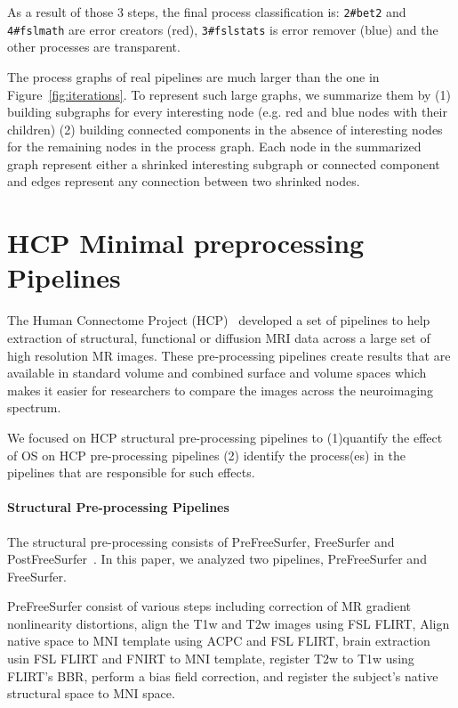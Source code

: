 \documentclass{article}
\begin{document}
{ As a result of those 3 steps, the final process classification is: 
 \texttt{2\#bet2} and \texttt{4\#fslmath} are error creators (red), 
 \texttt{3\#fslstats} is error remover (blue) and the other processes 
 are transparent.

The process graphs of real pipelines are much larger than the one in 
Figure~\ref{fig:iterations}. To represent such large graphs, we 
summarize them by (1) building subgraphs for every interesting node 
(e.g. red and blue nodes with their children) (2) building connected 
components in the absence of interesting nodes for the remaining nodes 
in the process graph. Each node in the summarized graph represent 
either a shrinked interesting subgraph or connected component and edges 
represent any connection between two shrinked nodes.



\section{HCP Minimal preprocessing Pipelines}


The Human Connectome Project (HCP)~\cite{glasser2013minimal} developed 
a set of pipelines to help extraction of structural, functional or 
diffusion MRI data across a large set of high resolution MR images. 
These pre-processing pipelines create results that are available in 
standard volume and combined surface and volume spaces which makes it 
easier for researchers to compare the images across the neuroimaging 
spectrum. 

We focused on HCP structural pre-processing pipelines to (1)quantify 
the effect of OS on HCP pre-processing pipelines (2) identify the 
process(es) in the pipelines that are responsible for such effects.

\paragraph{Structural Pre-processing Pipelines} The structural 
pre-processing consists of PreFreeSurfer, FreeSurfer and 
PostFreeSurfer~\cite{glasser2013minimal}. In this paper, we analyzed two 
pipelines, PreFreeSurfer and FreeSurfer. 

PreFreeSurfer consist of various steps including correction of MR 
gradient nonlinearity distortions, align the T1w and T2w images using 
FSL FLIRT, Align native space to MNI template using ACPC and FSL FLIRT, 
brain extraction usin FSL FLIRT and FNIRT to MNI template, register T2w 
to T1w using FLIRT's BBR, perform a bias field correction, and register 
the subject's native structural space to MNI space. 

}
\end{document}
